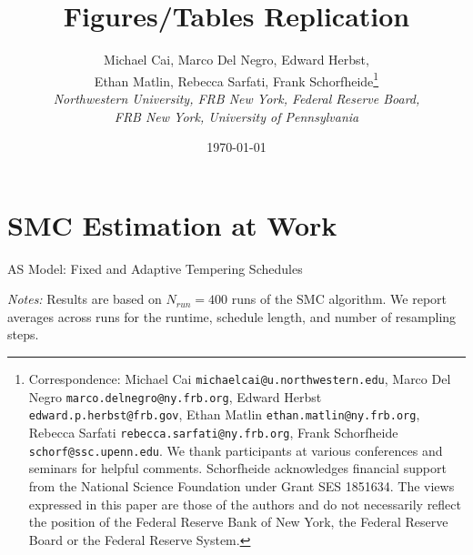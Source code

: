 \documentclass[12pt]{article}
\theoremstyle{definition}
\newcommand\plotroot{../figures_for_paper}
\begin{document}

\title{\bf \vspace*{-2cm} Figures/Tables Replication}
\author{Michael Cai, Marco Del Negro, Edward Herbst, \\ Ethan Matlin, Rebecca Sarfati, Frank Schorfheide\thanks{
Correspondence:  Michael Cai \texttt{michaelcai@u.northwestern.edu},
Marco Del Negro \texttt{marco.delnegro@ny.frb.org},
Edward Herbst \texttt{edward.p.herbst@frb.gov},
Ethan Matlin \texttt{ethan.matlin@ny.frb.org},
Rebecca Sarfati \texttt{rebecca.sarfati@ny.frb.org},
Frank Schorfheide \texttt{schorf@ssc.upenn.edu}.
We thank participants at various conferences and seminars for helpful comments. Schorfheide acknowledges financial support from the National Science Foundation under Grant SES 1851634.
The views expressed in this paper are those of the authors and do not necessarily reflect the position of the Federal Reserve Bank of New York, the Federal Reserve Board or the Federal Reserve System.\setlength{\baselineskip}{4mm} } \\
{\small {\em Northwestern University, FRB New York, Federal Reserve Board, }} \\
{\small {\em FRB New York, University of Pennsylvania}}}

\date{\today}
\maketitle

\thispagestyle{empty}


\section{SMC Estimation at Work}\label{sec:estimation}
\begin{table}[H]
    \caption{AS Model: Fixed and Adaptive Tempering Schedules}
    \label{tab:as.smcsummary}
    \begin{center}
        
    \end{center}
    {\footnotesize {\em Notes:} Results are based on $N_{run} = 400$ runs of the SMC algorithm. We report averages across runs for the runtime, schedule length, and number of resampling steps.}\setlength{\baselineskip}{4mm}
\end{table}
\end{document}

